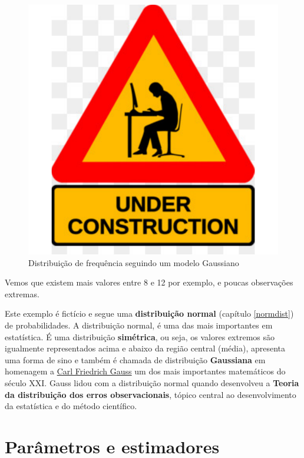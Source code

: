 \documentclass[
]{book}
\begin{document}
\begin{figure}

{\centering \includegraphics{probest-cambientais_files/figure-latex/unnamed-chunk-167-1} 

}

\caption{Distribuição de frequência seguindo um modelo Gaussiano}\label{fig:unnamed-chunk-167}
\end{figure}

Vemos que existem mais valores entre 8 e 12 por exemplo, e poucas observações extremas.

Este exemplo é fictício e segue uma \textbf{distribuição normal} (capítulo \ref{normdist}) de probabilidades. A distribuição normal, é uma das mais importantes em estatística. É uma distribuição \textbf{simétrica}, ou seja, os valores extremos são igualmente representados acima e abaixo da região central (média), apresenta uma forma de sino e também é chamada de distribuição \textbf{Gaussiana} em homenagem a \href{https://en.wikipedia.org/wiki/Carl_Friedrich_Gauss}{Carl Friedrich Gauss} um dos mais importantes matemáticos do século XXI. Gauss lidou com a distribuição normal quando desenvolveu a \textbf{Teoria da distribuição dos erros observacionais}, tópico central ao desenvolvimento da estatística e do método científico.

\hypertarget{paruxe2metros-e-estimadores}{%
\section{Parâmetros e estimadores}\label{paruxe2metros-e-estimadores}}
\end{document}
